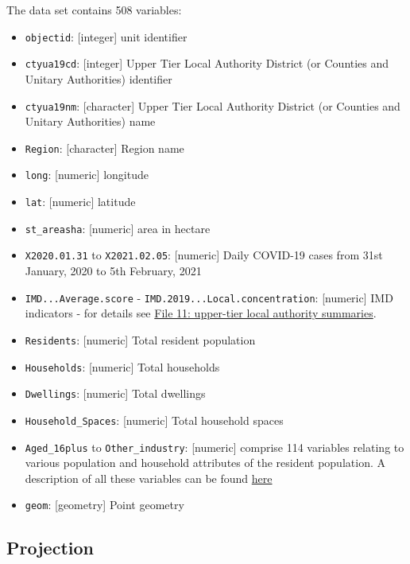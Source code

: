 \documentclass[
]{book}
\providecommand{\tightlist}{%
  \setlength{\itemsep}{0pt}\setlength{\parskip}{0pt}}
\begin{document}
The data set contains 508 variables:

\begin{itemize}
\tightlist
\item
  \texttt{objectid}: {[}integer{]} unit identifier
\item
  \texttt{ctyua19cd}: {[}integer{]} Upper Tier Local Authority District (or Counties and Unitary Authorities) identifier
\item
  \texttt{ctyua19nm}: {[}character{]} Upper Tier Local Authority District (or Counties and Unitary Authorities) name
\item
  \texttt{Region}: {[}character{]} Region name
\item
  \texttt{long}: {[}numeric{]} longitude
\item
  \texttt{lat}: {[}numeric{]} latitude
\item
  \texttt{st\_areasha}: {[}numeric{]} area in hectare
\item
  \texttt{X2020.01.31} to \texttt{X2021.02.05}: {[}numeric{]} Daily COVID-19 cases from 31st January, 2020 to 5th February, 2021
\item
  \texttt{IMD...Average.score} - \texttt{IMD.2019...Local.concentration}: {[}numeric{]} IMD indicators - for details see \href{https://www.gov.uk/government/statistics/english-indices-of-deprivation-2019}{File 11: upper-tier local authority summaries}.
\item
  \texttt{Residents}: {[}numeric{]} Total resident population
\item
  \texttt{Households}: {[}numeric{]} Total households
\item
  \texttt{Dwellings}: {[}numeric{]} Total dwellings
\item
  \texttt{Household\_Spaces}: {[}numeric{]} Total household spaces
\item
  \texttt{Aged\_16plus} to \texttt{Other\_industry}: {[}numeric{]} comprise 114 variables relating to various population and household attributes of the resident population. A description of all these variables can be found \href{data/assignment_2_covid/census_vars.csv}{here}
\item
  \texttt{geom}: {[}geometry{]} Point geometry
\end{itemize}

\hypertarget{projection-1}{%
\subsection*{Projection}\label{projection-1}}
\end{document}
